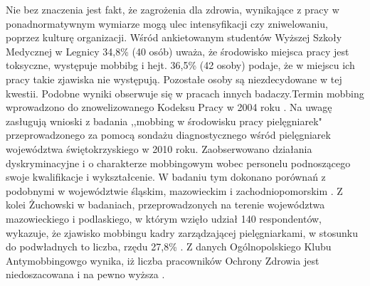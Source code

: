 \documentclass[a4paper,12pt,twoside,openany]{report}
\begin{document}
Nie bez znaczenia jest fakt, że zagrożenia  dla zdrowia, wynikające z pracy w ponadnormatywnym wymiarze mogą ulec intensyfikacji czy zniwelowaniu, poprzez kulturę organizacji. Wśród ankietowanym studentów Wyższej Szkoły Medycznej w Legnicy 34,8\% (40 osób) uważa, że środowisko miejsca pracy jest toksyczne, występuje mobbibg i hejt. 36,5\% (42 osoby) podaje, że w miejscu ich pracy takie zjawiska nie występują. Pozostałe osoby są niezdecydowane w tej kwestii.  Podobne wyniki obserwuje się w pracach innych badaczy.Termin mobbing wprowadzono do znowelizowanego Kodeksu Pracy w 2004 roku \cite{kodeks}. Na uwagę zasługują wnioski z badania ,,mobbing w środowisku pracy pielęgniarek" przeprowadzonego za pomocą sondażu diagnostycznego wśród pielęgniarek województwa świętokrzyskiego w 2010 roku. Zaobserwowano działania dyskryminacyjne i o charakterze mobbingowym wobec personelu podnoszącego swoje kwalifikacje i wykształcenie. W badaniu tym dokonano porównań z podobnymi w województwie śląskim, mazowieckim i zachodniopomorskim \cite{mobbing}. Z kolei Żuchowski w badaniach, przeprowadzonych na terenie województwa mazowieckiego i podlaskiego, w którym wzięło udział 140 respondentów, wykazuje, że zjawisko mobbingu kadry zarządzającej pielęgniarkami, w stosunku do podwładnych to liczba, rzędu 27,8\% \cite{żuchowski}. Z danych Ogólnopolskiego Klubu Antymobbingowgo wynika, iż liczba pracowników Ochrony Zdrowia jest niedoszacowana i na pewno wyższa \cite{grabowski}. 
\end{document}

